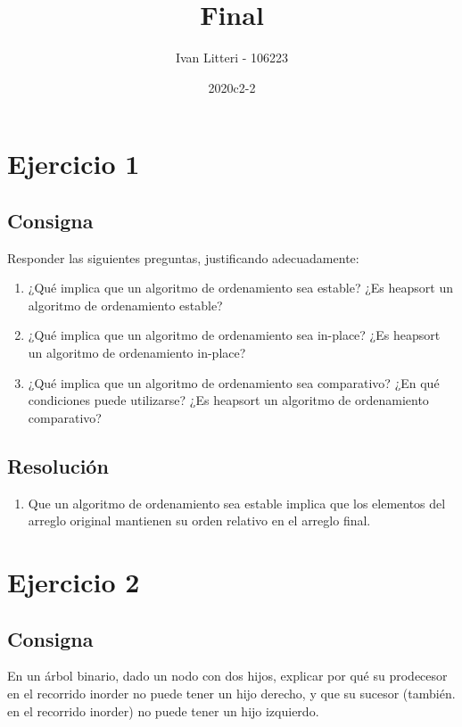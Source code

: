 \documentclass{article}
\title{Final}
\author{Ivan Litteri - 106223}
\date{2020c2-2}
\begin{document}
\maketitle

\lstset{language=Python}

\section{Ejercicio 1}

\subsection{Consigna}

Responder las siguientes preguntas, justificando adecuadamente:

\begin{enumerate}[label=\alph*)]
    \item ¿Qué implica que un algoritmo de ordenamiento sea estable? ¿Es heapsort un algoritmo de ordenamiento estable?
    \item ¿Qué implica que un algoritmo de ordenamiento sea in-place? ¿Es heapsort un algoritmo de ordenamiento in-place?
    \item ¿Qué implica que un algoritmo de ordenamiento sea comparativo? ¿En qué condiciones puede utilizarse? ¿Es heapsort un algoritmo de ordenamiento comparativo?
\end{enumerate}

\subsection{Resolución}

\begin{enumerate}[label=\alph*)]
    \item Que un algoritmo de ordenamiento sea estable implica que los elementos del arreglo original mantienen su orden relativo en el arreglo final.
\end{enumerate}

\section{Ejercicio 2}

\subsection{Consigna}

En un árbol binario, dado un nodo con dos hijos, explicar por qué su prodecesor en el recorrido inorder no puede tener un hijo derecho, y que su sucesor (también. en el recorrido inorder) no puede tener un hijo izquierdo.
\end{document}
